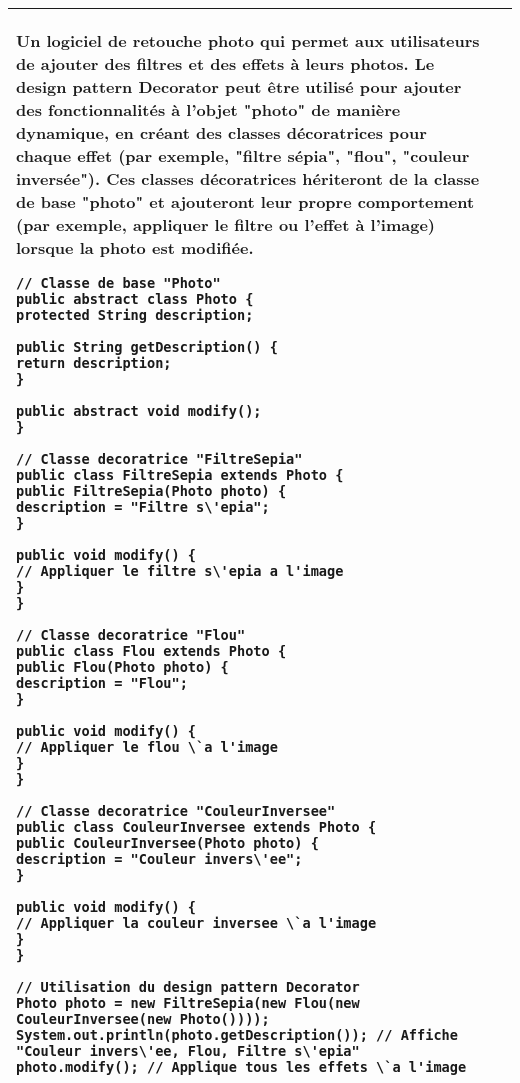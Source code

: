 \begin{table}[H]
\begin{adjustbox}{max width=\textwidth}
\begin{tabular}{l|p{\textwidth}}
\begin{minipage}[tl]{0.5\textwidth}
\end{minipage}
%
%
%
\hspace{6mm}
\begin{minipage}[tr]{0.5\textwidth}
\begin{minipage}[t]{1\textwidth}
Un logiciel de retouche photo qui permet aux utilisateurs de ajouter des filtres et des effets \`a leurs photos. Le design pattern Decorator peut \^etre utilis\'e pour ajouter des fonctionnalit\'es à l'objet "photo" de mani\`ere dynamique, en cr\'eant des classes d\'ecoratrices pour chaque effet (par exemple, "filtre s\'epia", "flou", "couleur invers\'ee"). Ces classes d\'ecoratrices h\'eriteront de la classe de base "photo" et ajouteront leur propre comportement (par exemple, appliquer le filtre ou l'effet à l'image) lorsque la photo est modifi\'ee.
\end{minipage}
\begin{minipage}[b]{1\textwidth}
\begin{lstlisting}[style=monstyle]
// Classe de base "Photo"
public abstract class Photo {
protected String description;

public String getDescription() {
return description;
}

public abstract void modify();
}

// Classe decoratrice "FiltreSepia"
public class FiltreSepia extends Photo {
public FiltreSepia(Photo photo) {
description = "Filtre s\'epia";
}

public void modify() {
// Appliquer le filtre s\'epia a l'image
}
}

// Classe decoratrice "Flou"
public class Flou extends Photo {
public Flou(Photo photo) {
description = "Flou";
}

public void modify() {
// Appliquer le flou \`a l'image
}
}

// Classe decoratrice "CouleurInversee"
public class CouleurInversee extends Photo {
public CouleurInversee(Photo photo) {
description = "Couleur invers\'ee";
}

public void modify() {
// Appliquer la couleur inversee \`a l'image
}
}

// Utilisation du design pattern Decorator
Photo photo = new FiltreSepia(new Flou(new CouleurInversee(new Photo())));
System.out.println(photo.getDescription()); // Affiche "Couleur invers\'ee, Flou, Filtre s\'epia"
photo.modify(); // Applique tous les effets \`a l'image
\end{lstlisting}
\end{minipage}
\end{minipage}
\\
\bottomrule
\end{tabular}
\end{adjustbox}
\end{table}